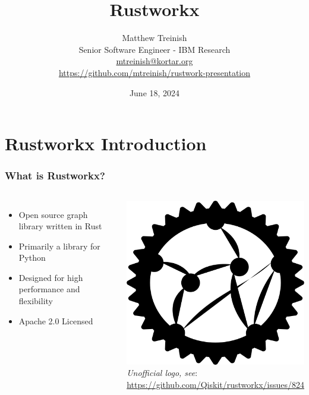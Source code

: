 \documentclass[aspectratio=169,11pt,hyperref={colorlinks=true}]{beamer}
\author[Matthew Treinish]{%
    \texorpdfstring{%
        \centering
        Matthew Treinish\\
        Senior Software Engineer - IBM Research\\
        \href{mailto:mtreinish@kortar.org}{mtreinish@kortar.org}\\
        \href{https://github.com/mtreinish/rustwork-presentation}{https://github.com/mtreinish/rustwork-presentation}
   }
   {Matthew Treinish}
}
\date{June 18, 2024}
\title{Rustworkx}
\begin{document}
\titlepage
\section{Rustworkx Introduction}
\begin{frame}
    \frametitle{What is Rustworkx?}
    \begin{columns}
            \begin{itemize}
                \item Open source graph library written in Rust
                \item Primarily a library for Python
                \item Designed for high performance and flexibility
                \item Apache 2.0 Licensed
            \end{itemize}
            \centering
            \includegraphics[width=.8\textwidth]{rustworkx_logo.png}\\
            \footnotesize
            \textit{Unofficial logo, see}:\\ \href{https://github.com/Qiskit/rustworkx/issues/824}{https://github.com/Qiskit/rustworkx/issues/824}
    \end{columns}
\end{frame}
\end{document}
